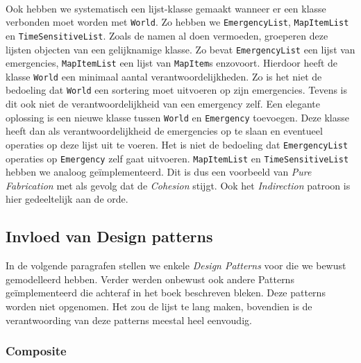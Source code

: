 \paragraph{}
Ook hebben we systematisch een lijst-klasse gemaakt wanneer er een klasse verbonden moet worden met \texttt{World}. Zo hebben we \texttt{EmergencyList}, \texttt{MapItemList} en \texttt{TimeSensitiveList}. Zoals de namen al doen vermoeden, groeperen deze lijsten objecten van een gelijknamige klasse. Zo bevat \texttt{EmergencyList} een lijst van emergencies, \texttt{MapItemList} een lijst van \texttt{MapItem}s enzovoort. Hierdoor heeft de klasse \texttt{World} een minimaal aantal verantwoordelijkheden. Zo is het niet de bedoeling dat \texttt{World} een sortering moet uitvoeren op zijn emergencies. Tevens is dit ook niet de verantwoordelijkheid van een emergency zelf. Een elegante oplossing is een nieuwe klasse tussen \texttt{World} en \texttt{Emergency} toevoegen. Deze klasse heeft dan als verantwoordelijkheid de emergencies op te slaan en eventueel operaties op deze lijst uit te voeren. Het is niet de bedoeling dat \texttt{EmergencyList} operaties op \texttt{Emergency} zelf gaat uitvoeren. \texttt{MapItemList} en \texttt{TimeSensitiveList} hebben we analoog ge\"implementeerd. Dit is dus een voorbeeld van \textit{Pure Fabrication} met als gevolg dat de \textit{Cohesion} stijgt. Ook het \textit{Indirection} patroon is hier gedeeltelijk aan de orde.
\subsection{Invloed van Design patterns}
\label{designpatterns}
In de volgende paragrafen stellen we enkele \textit{Design Patterns} voor die we bewust gemodelleerd hebben. Verder werden onbewust ook andere Patterns ge\"implementeerd die achteraf in het boek beschreven bleken. Deze patterns worden niet opgenomen. Het zou de lijst te lang maken, bovendien is de verantwoording van deze patterns meestal heel eenvoudig.
\subsubsection{Composite}
